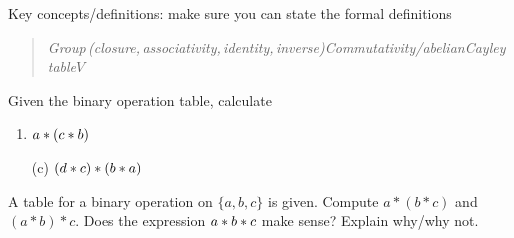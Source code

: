 \vfil

\begin{exercises}
Key concepts/definitions: make sure you can state the formal definitions
\begin{quote}
	\emph{Group\,(closure,\,associativity,\,identity,\,inverse)\quad Commutativity/abelian\quad Cayley table\quad $V$\quad {}}
\end{quote}



\begin{enumerate}
  \begin{minipage}[t]{0.72\linewidth}\vspace{0pt}
	\item Given the binary operation table, calculate
	\begin{enumerate}\itemsep0pt
		\item {} $a\mathbin{\ast} (c\mathbin{\ast} b)$
		\item[(c)]  $(d\mathbin{\ast} c)\mathbin{\ast} (b\mathbin{\ast} a)$
	\end{enumerate}
	\end{minipage}\hfill\begin{minipage}[t]{0.2\linewidth}\vspace{0pt}
	\flushright {}
	\end{minipage}\smallbreak

	\begin{minipage}[t]{0.72\linewidth}\vspace{0pt}
	\item A table for a binary operation on $\{a,b,c\}$ is given. Compute $a*(b*c)$ and $(a*b)*c$. Does the expression $a\mathbin{\ast} b\mathbin{\ast} c$ make sense? Explain why/why not.
	\end{minipage}\hfill\begin{minipage}[t]{0.2\linewidth}\vspace{0pt}
	\flushright {}
	\end{minipage}\par


\end{enumerate}
\end{exercises}
